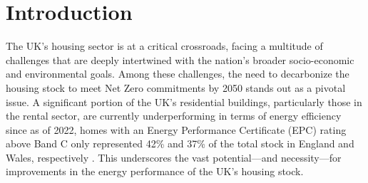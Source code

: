 \section{Introduction}

The UK's housing sector is at a critical crossroads, facing a multitude of challenges that are deeply intertwined with the nation's broader socio-economic and environmental goals. Among these challenges, the need to decarbonize the housing stock to meet Net Zero commitments by 2050 stands out as a pivotal issue. A significant portion of the UK’s residential buildings, particularly those in the rental sector, are currently underperforming in terms of energy efficiency since as of 2022, homes with an Energy Performance Certificate (EPC) rating above Band C only represented 42\% and 37\% of the total stock in England and Wales, respectively \cite{office_for_national_statistics_age_2022}. This underscores the vast potential—and necessity—for improvements in the energy performance of the UK’s housing stock.\\

